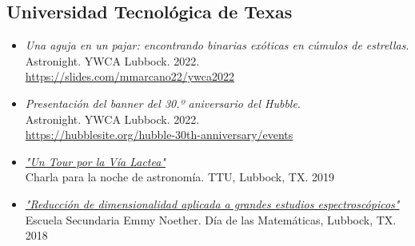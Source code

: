 \documentclass[letterpaper,10pt]{article}
\begin{document}
\subsection*{Universidad Tecnol\'ogica de Texas}

\begin{itemize}[label=$\blacktriangleright$]

	\item \textit{Una aguja en un pajar: encontrando binarias ex\'oticas en c\'umulos de estrellas}. \\
Astronight. YWCA Lubbock. 2022. \\
\url{https://slides.com/mmarcano22/ywca2022}



	\item \textit{Presentaci\'on del banner del 30.º aniversario del Hubble}. \\
Astronight. YWCA Lubbock. 2022. \\
\url{https://hubblesite.org/hubble-30th-anniversary/events}



	



	\item \textit{\href{https://slides.com/mmarcano22/a-tour-of-the-milky-way-2\#/}{"Un Tour por la V\'ia Lactea"}} \\ Charla para la noche de astronom\'ia. TTU, Lubbock, TX. 2019


	\item \textit{\href{http://manuelpm.me/PCASDSS/}{"Reducci\'on de dimensionalidad aplicada a grandes estudios espectrosc\'opicos"}} \\ Escuela Secundaria Emmy Noether. D\'ia de las Matem\'aticas, Lubbock, TX. 2018




\end{itemize}
\end{document}
